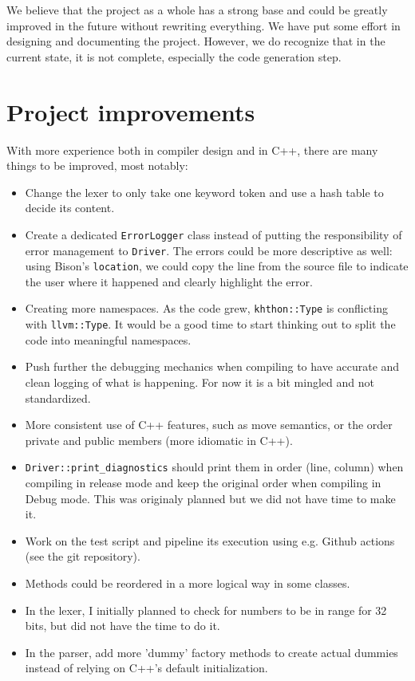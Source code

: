 \documentclass{article}
\begin{document}
We believe that the project as a whole has a strong base and could be greatly improved in the future without rewriting everything. We have put some effort in designing and documenting the project. However, we do recognize that in the current state, it is not complete, especially the code generation step. 

\section{Project improvements}
With more experience both in compiler design and in C++, there are many things to be improved, most notably:

\begin{itemize}
    \item Change the lexer to only take one keyword token and use a hash table to decide its content.
    \item Create a dedicated \texttt{ErrorLogger} class instead of putting the responsibility of error management to \texttt{Driver}. The errors could be more descriptive as well: using Bison's \texttt{location}, we could copy the line from the source file to indicate the user where it happened and clearly highlight the error.
    \item Creating more namespaces. As the code grew, \texttt{khthon::Type} is conflicting with \texttt{llvm::Type}. It would be a good time to start thinking out to split the code into meaningful namespaces.
    \item Push further the debugging mechanics when compiling to have accurate and clean logging of what is happening. For now it is a bit mingled and not standardized.
    \item More consistent use of C++ features, such as move semantics, or the order private and public members (more idiomatic in C++).
    \item \texttt{Driver::print\_diagnostics} should print them in order (line, column) when compiling in release mode and keep the original order when compiling in Debug mode. This was originaly planned but we did not have time to make it.
    \item Work on the test script and pipeline its execution using e.g. Github actions (see the git repository).
    \item Methods could be reordered in a more logical way in some classes.
    \item In the lexer, I initially planned to check for numbers to be in range for 32 bits, but did not have the time to do it.
    \item In the parser, add more 'dummy' factory methods to create actual dummies instead of relying on C++'s default initialization.
\end{itemize}
\end{document}
